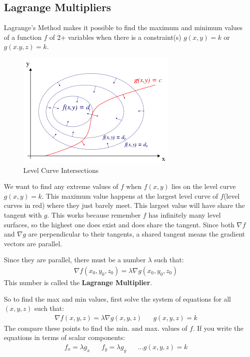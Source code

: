 \documentclass{article}
\newcommand{\n}{\nabla}
\begin{document}
\subsection{Lagrange Multipliers}
Lagrange's Method makes it possible to find the maximum and minimum values of a function $f$ of 2+ variables when there is a constraint(s) $g(x,y) = k$ or $g(x.y,z) = k$.
\begin{figure}[H]
\begin{center}
\includegraphics[scale=0.7]{LagrangeMultiplier.png}
\caption{Level Curve Intersections}
\label{lag-mult}
\end{center}
\end{figure}
We want to find any extreme values of $f$ when $f(x,y)$ lies on the level curve $g(x,y) = k$. This maximum value happens at the largest level curve of $f$(level curves in red) where they just barely meet. This largest value will have share the tangent with $g$. This works because remember $f$ has infinitely many level surfaces, so the highest one does exist and does share the tangent. Since both $\n f$ and $\n g$ are perpendicular to their tangents, a shared tangent means the gradient vectors are parallel.

Since they are parallel, there must be a number $\lambda$ such that:
\begin{gather*}
    \n f(x_0,y_0,z_0) = \lambda \n g(x_0,y_0,z_0)
\end{gather*}
This number is called the \textbf{Lagrange Multiplier}.

So to find the max and min values, first solve the system of equations for all $(x,y,z)$ such that:
\begin{gather*}
    \n f(x,y,z) = \lambda \n g(x,y,z)\hspace{20pt}g(x,y,z) = k
\end{gather*}
The compare these points to find the min. and max. values of $f$. If you write the equations in terms of scalar components:
\begin{gather*}
    f_x = \lambda g_x\hspace{20pt}f_y = \lambda g_y\hspace{20pt}...g(x,y,z) = k
\end{gather*}
\end{document}
